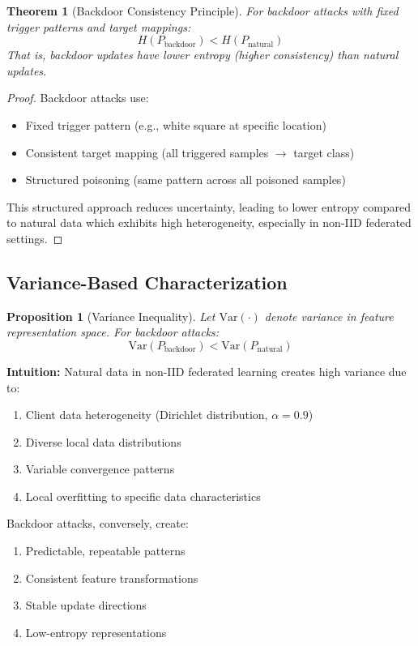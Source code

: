 \documentclass[11pt,a4paper]{article}
\newtheorem{theorem}{Theorem}
\newtheorem{proposition}{Proposition}
\begin{document}
\begin{theorem}[Backdoor Consistency Principle]
For backdoor attacks with fixed trigger patterns and target mappings:
\[
H(P_{\text{backdoor}}) < H(P_{\text{natural}})
\]
That is, backdoor updates have lower entropy (higher consistency) than natural updates.
\end{theorem}

\begin{proof}
Backdoor attacks use:
\begin{itemize}
    \item Fixed trigger pattern (e.g., white square at specific location)
    \item Consistent target mapping (all triggered samples $\rightarrow$ target class)
    \item Structured poisoning (same pattern across all poisoned samples)
\end{itemize}
This structured approach reduces uncertainty, leading to lower entropy compared to natural data which exhibits high heterogeneity, especially in non-IID federated settings.
\end{proof}

\subsection{Variance-Based Characterization}

\begin{proposition}[Variance Inequality]
Let $\text{Var}(\cdot)$ denote variance in feature representation space. For backdoor attacks:
\[
\text{Var}(P_{\text{backdoor}}) < \text{Var}(P_{\text{natural}})
\]
\end{proposition}

\textbf{Intuition:} Natural data in non-IID federated learning creates high variance due to:
\begin{enumerate}
    \item Client data heterogeneity (Dirichlet distribution, $\alpha = 0.9$)
    \item Diverse local data distributions
    \item Variable convergence patterns
    \item Local overfitting to specific data characteristics
\end{enumerate}

Backdoor attacks, conversely, create:
\begin{enumerate}
    \item Predictable, repeatable patterns
    \item Consistent feature transformations
    \item Stable update directions
    \item Low-entropy representations
\end{enumerate}
\end{document}
